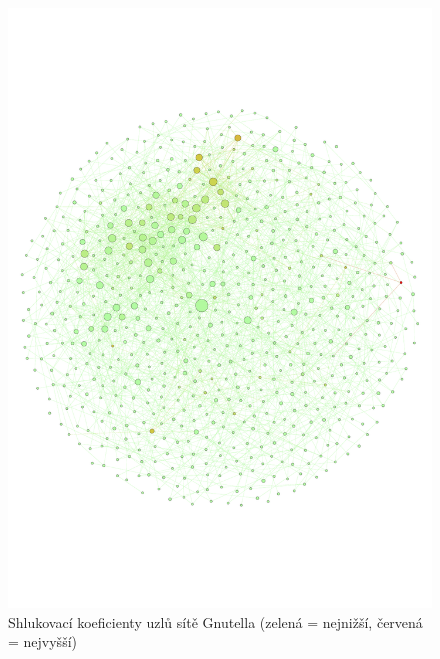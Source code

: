 \documentclass[A4]{article}
\begin{document}
\begin{figure}
    \centering
    \includegraphics[width=1\textwidth]{clustering-coefficient-ranking.pdf}
    \caption{Shlukovací koeficienty uzlů sítě Gnutella (zelená = nejnižší, červená = nejvyšší)}
    \label{clustering}
\end{figure}
\end{document}
